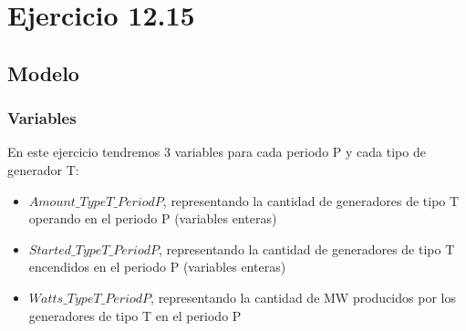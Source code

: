 \section{Ejercicio 12.15}
\subsection{Modelo}
\subsubsection{Variables}
En este ejercicio tendremos 3 variables para cada periodo P y cada tipo de generador T:
\begin{itemize}
\item $Amount\_TypeT\_PeriodP$, representando la cantidad de generadores de tipo T operando en el periodo P (variables enteras)
\item $Started\_TypeT\_PeriodP$, representando la cantidad de generadores de tipo T encendidos en el periodo P (variables enteras)
\item $Watts\_TypeT\_PeriodP$, representando la cantidad de MW producidos por los generadores de tipo T en el periodo P
\end{itemize}
